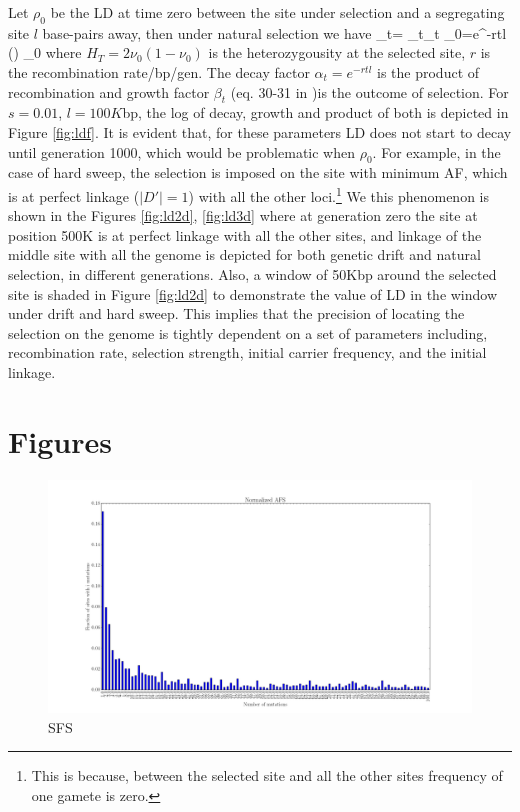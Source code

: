 \documentclass[11pt]{article}
\begin{document}
Let $\rho_0$ be the LD at time zero between the site under selection and a 
segregating site $l$ base-pairs away, then under natural selection we have
\beq
\rho_t= \alpha_t\beta_t \rho_0=e^{-rtl} \left(\right)  
\rho_0\label{eq:ldt}
\eeq
where $H_T=2\nu_0(1-\nu_0)$ is the heterozygousity at the selected site, $r$ is 
the recombination rate/bp/gen. The decay factor $\alpha_t=e^{-rtl}$ is the 
product of recombination and growth factor $\beta_t$ (eq. 30-31 in 
\cite{Stephan2006The})is the outcome of 
selection. For $s=0.01$, $l=100K$bp, the log of decay, growth and product of 
both is depicted in Figure \ref{fig:ldf}. It is evident that, for these 
parameters LD does not start to decay until generation 1000, which would be  
problematic when $\rho_0$. For example, in the case of hard sweep, the 
selection is imposed on the site with minimum AF, which is at perfect linkage 
($|D'|=1$) with all the other loci.\footnote{This is because, between the 
	selected site and all the other sites frequency of one gamete is zero.}
We this phenomenon is shown in the Figures \ref{fig:ld2d}, \ref{fig:ld3d} where 
at generation zero the site at position 500K is at perfect linkage with all the 
other sites, and linkage of the middle site with all the genome is depicted 
for both genetic drift and natural selection, in different generations.
Also, a window of 50Kbp around the selected site is shaded in Figure 
\ref{fig:ld2d} to demonstrate the value of LD in the window under drift and 
hard sweep. This implies that the precision of locating the selection on the 
genome is tightly dependent on a set of parameters including, recombination 
rate, selection strength, initial carrier frequency, and the initial linkage.



\section{Figures}

\begin{figure}[H]
	\centering
	\includegraphics[scale=0.2]{afs}
	\caption{SFS}	\label{fig:afs}
\end{figure}
\end{document}
